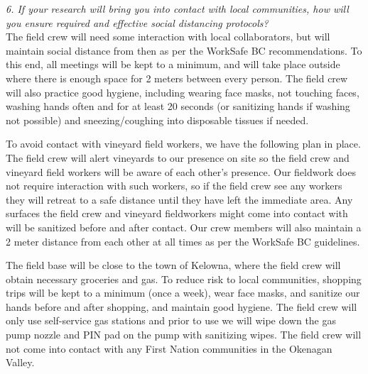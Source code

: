 \documentclass[11pt,letter]{article}
\begin{document}
\emph{6. If your research will bring you into contact with local communities, how will you ensure required and effective social distancing protocols?}\\

The field crew will need some interaction with local collaborators, but will maintain social distance from then as per the WorkSafe BC recommendations. To this end, all meetings will be kept to a minimum, and will take place outside where there is enough space for 2 meters between every person. The field crew will also practice good hygiene, including wearing face masks, not touching faces, washing hands often and for at least 20 seconds (or sanitizing hands if washing not possible) and sneezing/coughing into disposable tissues if needed.  

To avoid contact with vineyard field workers, we have the following plan in place. The field crew will alert vineyards to our presence on site so the field crew and vineyard field workers will be aware of each other's presence. Our fieldwork does not require interaction with such workers, so if the field crew see any workers they will retreat to a safe distance until they have left the immediate area. Any surfaces the field crew and vineyard fieldworkers might come into contact with will be sanitized before and after contact. Our crew members will also maintain a 2 meter distance from each other at all times as per the WorkSafe BC guidelines.   

The field base will be close to the town of Kelowna, where the field crew will obtain necessary groceries and gas. To reduce risk to local communities, shopping trips will be kept to a minimum (once a week), wear face masks, and sanitize our hands before and after shopping, and maintain good hygiene. The field crew will only use self-service gas stations and prior to use we will wipe down the gas pump nozzle and PIN pad on the pump with sanitizing wipes. The field crew will not come into contact with any First Nation communities in the Okenagan Valley. 
\end{document}
